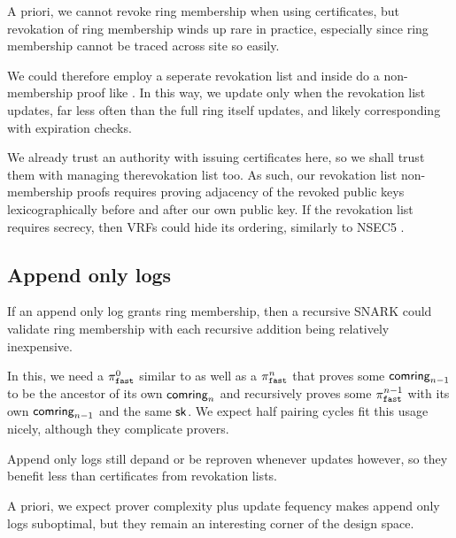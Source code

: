 
A priori, we cannot revoke ring membership when using certificates,
but revokation of ring membership winds up rare in practice, especially
since ring membership cannot be traced across site so easily.

We could therefore employ a seperate revokation list and inside \pifast
do a non-membership proof like \cite{???}.
In this way, we update \pifast only when the revokation list updates,
far less often than the full ring \ctx itself updates, and likely
corresponding with expiration checks.

We already trust an authority with issuing certificates here, so
we shall trust them with managing therevokation list too.  As such,
our revokation list non-membership proofs requires proving adjacency
of the revoked public keys lexicographically before and after our own
public key.  If the revokation list requires secrecy, then VRFs could
hide its ordering, similarly to NSEC5 \cite{nsec5}.


\subsection{Append only logs}

If an append only log grants ring membership, then a recursive SNARK
could validate ring membership with each recursive addition being
relatively inexpensive.

In this, we need a $\pi_{\mathtt{fast}}^0$ similar to \pifast as well as a
$\pi_{\mathtt{fast}}^n$ that proves some $\mathsf{comring}_{n-1}$ to be the ancestor of
its own $\mathsf{comring}_n$ and recursively proves some $\pi_{\mathtt{fast}}^{n-1}$ with
its own $\mathsf{comring}_{n-1}$ and the same $\mathsf{sk}$.
We expect half pairing cycles fit this usage nicely, although they complicate provers.

Append only logs still depand \pifast or \pisafe be reproven whenever
\ctx updates however, so they benefit less than certificates from revokation lists.

A priori, we expect prover complexity plus update fequency makes
append only logs suboptimal, but
 they remain an interesting corner of the design space.

